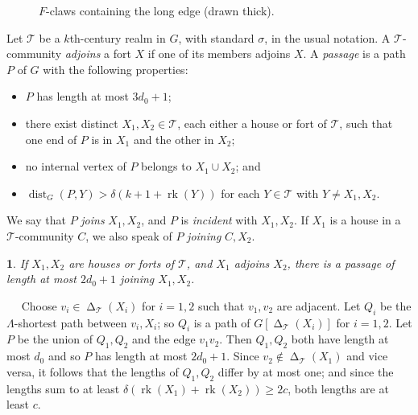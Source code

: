 \documentclass[titlepage,11pt]{article}
\newcommand{\dist}{\operatorname{dist}}
\newcommand{\voro}{\operatorname{\Delta}}
\newcommand{\rk}{\operatorname{rk}}
\newcommand{\mac}{\mathcal}
\newtheorem{thm}{}[section]
\newcommand{\Proof}{\noindent{\bf Proof.}\ \ }
\begin{document}
\begin{figure}[H]
\begin{center}
		\end{center}
		\caption{$F$-claws containing the long edge (drawn thick).} \label{fig:longedgeclaw}
	\end{figure}
	
	Let $\mac T$ be a $k$th-century realm in $G$, with standard $\sigma$, in the usual notation. 
	A $\mac T$-community {\em adjoins} a fort $X$ if one of its
	members adjoins $X$.
	A {\em passage} is a path $P$ of $G$
	with the following properties:
	\begin{itemize}
		\item $P$ has length at most $3d_0+1$;
		\item there exist distinct $X_1,X_2\in \mac T$, each either a house or fort of $\mac T$, such that one end of $P$ is in $X_1$ and the other in $X_2$;
		\item no internal vertex of $P$ belongs to $X_1\cup X_2$; and
		\item $\dist_G(P,Y)>  \delta(k+1+\rk(Y))$ for each $Y\in \mac T$ with $Y\ne X_1,X_2$.
	\end{itemize}
	We say that $P$ {\em joins} $X_1,X_2$, and $P$ is {\em incident} with $X_1,X_2$. If $X_1$ is a house in a $\mac T$-community $C$, we also speak of 
	$P$ {\em joining} $C,X_2$. 
	\begin{thm}\label{adjoinpassage}
		If $X_1,X_2$ are houses or forts of $\mac T$, and $X_1$ adjoins $X_2$, there is a passage of length at most $2d_0+1$ joining $X_1,X_2$.
	\end{thm}
	\Proof
	Choose $v_i\in \voro_{\mac T}(X_i)$ for $i = 1,2$ such that $v_1,v_2$ are adjacent. Let $Q_i$ be the $\Lambda$-shortest path between 
	$v_i, X_i$; so $Q_i$
	is a path of $G[\voro_{\mac T}(X_i)]$ for $i = 1,2$. Let $P$ be the union of $Q_1,Q_2$ and the edge $v_1v_2$.
	Then $Q_1,Q_2$ both have length at most $d_0$ and so $P$ has length at most $2d_0+1$. Since $v_2\notin \voro_{\mac T}(X_1)$ and vice versa,
	it follows
	that the lengths of $Q_1,Q_2$ differ by at most one; and since the lengths sum to at least $\delta(\rk(X_1)+\rk(X_2))\ge 2c$, both lengths
	are at least $c$. 
	
\end{document}
